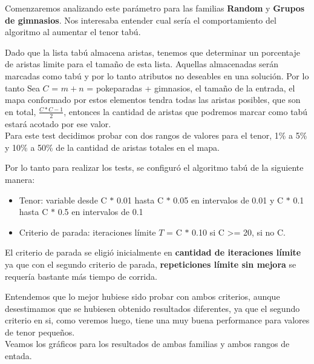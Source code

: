 Comenzaremos analizando este parámetro para las familias \textbf{Random} y \textbf{Grupos de gimnasios}.
Nos interesaba entender cual sería el comportamiento del algoritmo al aumentar el tenor tabú.

Dado que la lista tabú almacena aristas, tenemos que determinar un porcentaje de aristas limite para el tamaño de esta lista. Aquellas almacenadas serán marcadas como tabú y por lo tanto atributos no deseables en una solución.
Por lo tanto Sea $C$ = $m+n$ = pokeparadas + gimnasios, el tamaño de la entrada, el mapa conformado por estos elementos tendra todas las aristas posibles, que son en total, $\frac{C \ast C-1}{2}$, entonces la cantidad de aristas que podremos marcar como tabú estará acotado por ese valor.\\
Para este test decidimos probar con dos rangos de valores para el tenor, 1\% a 5\% y 10\% a 50\% de la cantidad de aristas totales en el mapa.

Por lo tanto para realizar los tests, se configuró el algoritmo tabú de la siguiente manera:

\begin{itemize}
\item Tenor: variable desde C $\ast$ 0.01 hasta C $\ast$ 0.05 en intervalos de 0.01 y C $\ast$ 0.1 hasta C $\ast$ 0.5 en intervalos de 0.1
\item Criterio de parada: iteraciones límite $T$ = C $\ast$ 0.10 si C >= 20, si no C.
\end{itemize}

El criterio de parada se eligió inicialmente en \textbf{cantidad de iteraciones límite} ya que con el segundo criterio de parada, \textbf{repeticiones límite sin mejora} se requería bastante más tiempo de corrida. 

Entendemos que lo mejor hubiese sido probar con ambos criterios, aunque desestimamos que se hubiesen obtenido resultados diferentes, ya que el segundo criterio en si, como veremos luego, tiene una muy buena performance para valores de tenor pequeños.\\

Veamos los gráficos para los resultados de ambas familias y ambos rangos de entada.
\\\\

